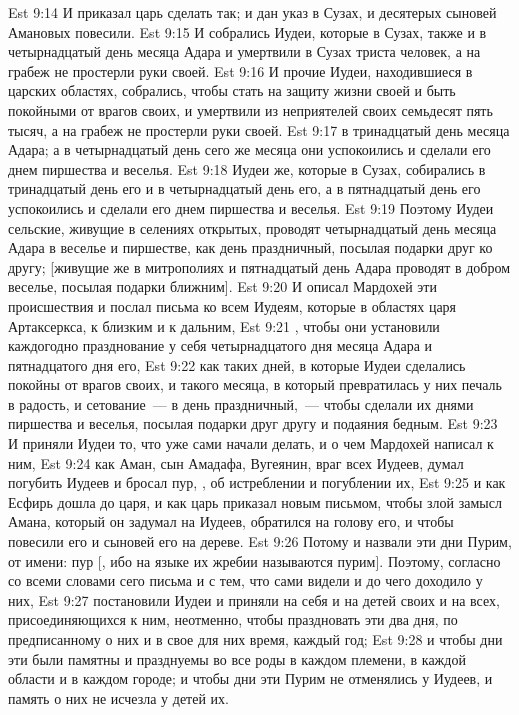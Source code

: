 \vs Est 9:14 И приказал царь сделать так; и дан  указ в Сузах, и десятерых сыновей Амановых повесили.
\rsbpar\vs Est 9:15 И собрались Иудеи, которые в Сузах, также и в четырнадцатый день месяца Адара и умертвили в Сузах триста человек, а на грабеж не простерли руки своей.
\vs Est 9:16 И прочие Иудеи, находившиеся в царских областях, собрались, чтобы стать на защиту жизни своей и быть покойными от врагов своих, и умертвили из неприятелей своих семьдесят пять тысяч, а на грабеж не простерли руки своей.
\vs Est 9:17  в тринадцатый день месяца Адара; а в четырнадцатый день сего же месяца они успокоились и сделали его днем пиршества и веселья.
\vs Est 9:18 Иудеи же, которые в Сузах, собирались в тринадцатый день его и в четырнадцатый день его, а в пятнадцатый день его успокоились и сделали его днем пиршества и веселья.
\vs Est 9:19 Поэтому Иудеи сельские, живущие в селениях открытых, проводят четырнадцатый день месяца Адара в веселье и пиршестве, как день праздничный, посылая подарки друг ко другу; [живущие же в митрополиях и пятнадцатый день Адара проводят в добром веселье, посылая подарки ближним].
\rsbpar\vs Est 9:20 И описал Мардохей эти происшествия и послал письма ко всем Иудеям, которые в областях царя Артаксеркса, к близким и к дальним,
\vs Est 9:21 , чтобы они установили каждогодно празднование у себя четырнадцатого дня месяца Адара и пятнадцатого дня его,
\vs Est 9:22 как таких дней, в которые Иудеи сделались покойны от врагов своих, и  такого месяца, в который превратилась у них печаль в радость, и сетование~--- в день праздничный,~--- чтобы сделали их днями пиршества и веселья, посылая подарки друг другу и подаяния бедным.
\vs Est 9:23 И приняли Иудеи то, что уже сами начали делать, и о чем Мардохей написал к ним,
\vs Est 9:24 как Аман, сын Амадафа, Вугеянин, враг всех Иудеев, думал погубить Иудеев и бросал пур, , об истреблении и погублении их,
\vs Est 9:25 и как Есфирь дошла до царя, и как царь приказал новым письмом, чтобы злой замысл Амана, который он задумал на Иудеев, обратился на голову его, и чтобы повесили его и сыновей его на дереве.
\vs Est 9:26 Потому и назвали эти дни Пурим, от имени: пур [, ибо на языке их жребии называются пурим]. Поэтому, согласно со всеми словами сего письма и с тем, что сами видели и до чего доходило у них,
\vs Est 9:27 постановили Иудеи и приняли на себя и на детей своих и на всех, присоединяющихся к ним, неотменно, чтобы праздновать эти два дня, по предписанному о них и в свое для них время, каждый год;
\vs Est 9:28 и чтобы дни эти были памятны и празднуемы во все роды в каждом племени, в каждой области и в каждом городе; и чтобы дни эти Пурим не отменялись у Иудеев, и память о них не исчезла у детей их.
